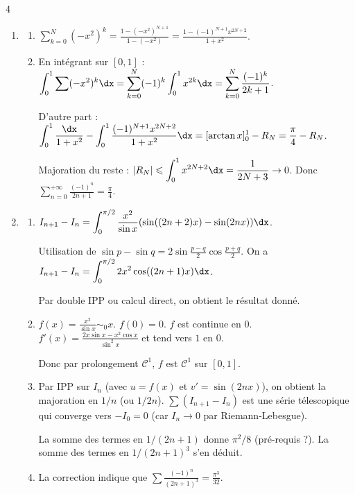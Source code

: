 \begin{correction}{4}
\begin{enumerate}
    \item
    \begin{enumerate}
        \item $\displaystyle \sum_{k=0}^N (-x^2)^k = \frac{1-(-x^2)^{N+1}}{1-(-x^2)} = \frac{1-(-1)^{N+1}x^{2N+2}}{1+x^2}$.
        \item 
            En intégrant sur $[0,1]$ :
            $\displaystyle \int_0^1 \sum (-x^2)^k \dx = \sum_{k=0}^N (-1)^k \int_0^1 x^{2k} \dx = \sum_{k=0}^N \frac{(-1)^k}{2k+1}$.

            D'autre part : $\displaystyle\int_0^1 \frac{\dx}{1+x^2} - \int_0^1 \frac{(-1)^{N+1}x^{2N+2}}{1+x^2} \dx = [\arctan x]_0^1 - R_N = \frac{\pi}{4} - R_N$.

            Majoration du reste : $\displaystyle |R_N| \leqslant \int_0^1 x^{2N+2} \dx = \frac{1}{2N+3} \to 0$.
            Donc $\displaystyle \sum_{n=0}^{+\infty} \frac{(-1)^n}{2n+1} = \frac{\pi}{4}$.
    \end{enumerate}
    
    \item
    \begin{enumerate}
        \item 
            $\displaystyle I_{n+1}-I_n = \int_0^{\pi/2} \frac{x^2}{\sin x} (\sin((2n+2)x) - \sin(2nx)) \dx$.
            
            Utilisation de $\sin p - \sin q = 2 \sin\frac{p-q}{2} \cos\frac{p+q}{2}$.
            On a $\displaystyle I_{n+1}-I_n = \int_0^{\pi/2} 2x^2 \cos((2n+1)x) \dx$.

            Par double IPP ou calcul direct, on obtient le résultat donné.

        \item 
            $f(x) = \frac{x^2}{\sin x} \sim_0 x$. $f(0)=0$. $f$ est continue en 0.
            $f'(x) = \frac{2x\sin x - x^2\cos x}{\sin^2 x}$ et tend vers $1$ en $0$.

            Donc par prolongement $\mathscr C^1$, $f$ est $\mathscr C^1$ sur $[0,1]$.

        \item
            Par IPP sur $I_n$ (avec $u=f(x)$ et $v'=\sin(2nx)$), on obtient la majoration en $1/n$ (ou $1/2n$).
            $\sum (I_{n+1}-I_n)$ est une série télescopique qui converge vers $-I_0 = 0$ (car $I_n \to 0$ par Riemann-Lebesgue).

            La somme des termes en $1/(2n+1)$ donne $\pi^2/8$ (pré-requis ?). La somme des termes en $1/(2n+1)^3$ s'en déduit.
        
        \item La correction indique que $\sum \frac{(-1)^n}{(2n+1)^3} = \frac{\pi^3}{32}$.
    \end{enumerate}
\end{enumerate}
\end{correction}

